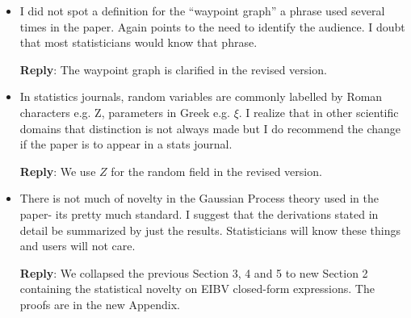 \documentclass[a4paper]{article}
\def\reply{\textbf{Reply}}
\begin{document}
\begin{answers}
\begin{itemize}[noitemsep,topsep=0pt,parsep=0pt,partopsep=0pt]
\reply: The revised Section 2 contains a general formulation for random sets, which is then exemplified by our ESs for the multivariate process. In the Introduction and Section 2 we motivate the ES for multivariate processes for this application. In many applications it is important to find zones with joint high values of many variables. In our context, the temperature and salinity are proxies for biological variables which are not easily measured.

\vspace{1em}

\item I did not spot a definition for the “waypoint graph” a phrase used several times in the paper. Again points to the need to identify the audience. I doubt that most statisticians would know that phrase.\par
\reply: The waypoint graph is clarified in the revised version.  
\vspace{1em}

\item In statistics journals, random variables are commonly labelled by Roman characters e.g. Z, parameters in Greek e.g. $\xi$. I realize that in other scientific domains that distinction is not always made but I do recommend the change if the paper is to appear in a stats journal.\par

\reply: We use $Z$ for the random field in the revised version.
\vspace{1em}

\item There is not much of novelty in the Gaussian Process theory used in the paper- its pretty much standard. I suggest that the derivations stated in detail be summarized by just the results. Statisticians will know these things and users will not care.\par

\reply: We collapsed the previous Section 3, 4 and 5 to new Section 2 containing the statistical novelty on EIBV closed-form expressions. The proofs are in the new Appendix.

\vspace{1em}

\end{itemize}

\end{answers}


\end{document}
